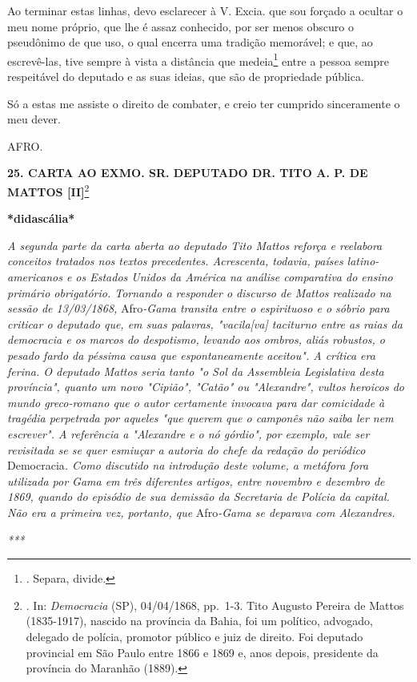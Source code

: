 Ao terminar estas linhas, devo esclarecer à V. Excia. que sou forçado a
ocultar o meu nome próprio, que lhe é assaz conhecido, por ser menos
obscuro o pseudônimo de que uso, o qual encerra uma tradição memorável;
e que, ao escrevê-las, tive sempre à vista a distância que
medeia\footnote{. Separa, divide.} entre a pessoa sempre respeitável do
deputado e as suas ideias, que são de propriedade pública.

Só a estas me assiste o direito de combater, e creio ter cumprido
sinceramente o meu dever.

AFRO.

\textbf{25. CARTA AO EXMO. SR. DEPUTADO DR. TITO A. P. DE MATTOS
{[}II{]}}\footnote{. In: \emph{Democracia} (SP), 04/04/1868, pp.~1-3.
  Tito Augusto Pereira de Mattos (1835-1917), nascido na província da
  Bahia, foi um político, advogado, delegado de polícia, promotor
  público e juiz de direito. Foi deputado provincial em São Paulo entre
  1866 e 1869 e, anos depois, presidente da província do Maranhão
  (1889).}

\textbf{*didascália*}

\emph{A segunda parte da carta aberta ao deputado Tito Mattos reforça e
reelabora conceitos tratados nos textos precedentes. Acrescenta,
todavia, países latino-americanos e os Estados Unidos da América na
análise comparativa do ensino primário obrigatório. Tornando a responder
o discurso de Mattos realizado na sessão de 13/03/1868,} Afro\emph{-Gama
transita entre o espirituoso e o sóbrio para criticar o deputado que, em
suas palavras, "vacila{[}va{]} taciturno entre as raias da democracia e
os marcos do despotismo, levando aos ombros, aliás robustos, o pesado
fardo da péssima causa que espontaneamente aceitou". A crítica era
ferina. O deputado Mattos seria tanto "o Sol da Assembleia Legislativa
desta província", quanto um novo "Cipião", "Catão" ou "Alexandre",
vultos heroicos do mundo greco-romano que o autor certamente invocava
para dar comicidade à tragédia perpetrada por aqueles "que querem que o
camponês não saiba ler nem escrever". A referência a "Alexandre e o nó
górdio", por exemplo, vale ser revisitada se se quer esmiuçar a autoria
do chefe da redação do periódico} Democracia\emph{. Como discutido na
introdução deste volume, a metáfora fora utilizada por Gama em três
diferentes artigos, entre novembro e dezembro de 1869, quando do
episódio de sua demissão da Secretaria de Polícia da capital. Não era a
primeira vez, portanto, que} Afro\emph{-Gama se deparava com
Alexandres.}

\emph{***}

